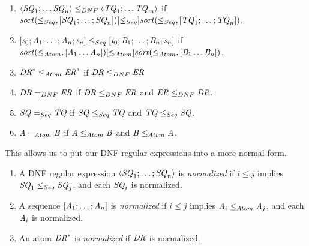 \documentclass[numbers]{sigplanconf}
\begin{document}
\begin{definition}
  \begin{enumerate}
  \item
    $\langle\mathit{SQ}_1;\ldots\mathit{SQ}_n\rangle
    \leq_{DNF}
    \langle\mathit{TQ}_1;\ldots\mathit{TQ}_m\rangle$
    if
    $\mathit{sort}(\leq_{Seq},[ \mathit{SQ}_1;\ldots;\mathit{SQ}_n ])
    [ \leq_{Seq} ]
    \mathit{sort}(\leq_{Seq},[\mathit{TQ}_1;\ldots;\mathit{TQ}_n])$.
    
  \item
    $[\mathit{s}_0;\mathit{A}_1;\ldots;\mathit{A}_n;\mathit{s}_n]
    \leq_{Seq}
    [\mathit{t}_0;\mathit{B}_1;\ldots;\mathit{B}_n;\mathit{s}_n]$
    if
    $\mathit{sort}(\leq_{Atom},[ \mathit{A}_1\ldots\mathit{A}_n ])
    [ \leq_{Atom} ]
    \mathit{sort}(\leq_{Atom},[\mathit{B}_1\ldots\mathit{B}_n])$.

  \item
    ${\mathit{DR}}^* \leq_{Atom} {\mathit{ER}}^*$
    if
    $\mathit{DR} \leq_{DNF} \mathit{ER}$

  \item 
    $\mathit{DR} =_{DNF} \mathit{ER}$
    if
    $\mathit{DR} \leq_{DNF} \mathit{ER}$ and $\mathit{ER} \leq_{DNF} \mathit{DR}$.

  \item
    $\mathit{SQ} =_{Seq} \mathit{TQ}$
    if
    $\mathit{SQ} \leq_{Seq} \mathit{TQ}$ and $\mathit{TQ} \leq_{Seq}
    \mathit{SQ}$.

  \item
    $\mathit{A} =_{Atom} \mathit{B}$
    if
    $\mathit{A} \leq_{Atom} \mathit{B}$ and $\mathit{B} \leq_{Atom} \mathit{A}$.
  \end{enumerate}
\end{definition}

This allows us to put our DNF regular expressions into a more normal form.

\begin{definition}
  \begin{enumerate}
  \item A DNF regular expression $\langle\mathit{SQ}_1;\ldots;\mathit{SQ}_n\rangle$ is
    \textit{normalized} if $i \leq j$ implies $\mathit{SQ}_1\leq_{Seq}\mathit{SQ}_j$,
    and each $\mathit{SQ}_i$ is normalized.
  \item A sequence $[\mathit{A}_1;\ldots;\mathit{A}_n]$ is \textit{normalized}
    if $i \leq j$ implies $\mathit{A}_i\leq_{Atom}\mathit{A}_j$,
    and each $\mathit{A}_i$ is normalized.
  \item An atom ${\mathit{DR}}^*$ is \textit{normalized} if
    $\mathit{DR}$ is normalized.
  \end{enumerate}
\end{definition}
\end{document}

